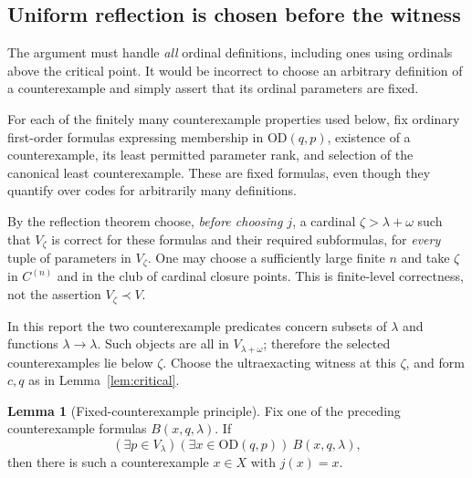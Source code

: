 \documentclass[11pt,letterpaper]{article}
\theoremstyle{definition}
\newtheorem{lemma}[definition]{Lemma}
\numberwithin{equation}{section}
\newcommand{\OD}{\mathrm{OD}}
\begin{document}
\subsection{Uniform reflection is chosen before the witness}

The argument must handle \emph{all} ordinal definitions, including
ones using ordinals above the critical point. It would be incorrect
to choose an arbitrary definition of a counterexample and simply
assert that its ordinal parameters are fixed.

For each of the finitely many counterexample properties used below,
fix ordinary first-order formulas expressing membership in
$\OD(q,p)$, existence of a counterexample, its least permitted
parameter rank, and selection of the canonical least counterexample.
These are fixed formulas, even though they quantify over codes for
arbitrarily many definitions.

By the reflection theorem choose, \emph{before choosing $j$}, a cardinal
$\zeta>\lambda+\omega$ such that $V_\zeta$ is correct for these formulas
and their required subformulas, for \emph{every} tuple of parameters
in $V_\zeta$. One may choose a sufficiently large finite $n$ and take
$\zeta$ in $C^{(n)}$ and in the club of cardinal closure points.
This is finite-level correctness, not the assertion
$V_\zeta\prec V$.

In this report the two counterexample predicates concern subsets of
$\lambda$ and functions $\lambda\to\lambda$. Such objects are all in
$V_{\lambda+\omega}$; therefore the selected counterexamples lie
below $\zeta$. Choose the ultraexacting witness at this $\zeta$, and
form $c,q$ as in Lemma~\ref{lem:critical}.

\begin{lemma}[Fixed-counterexample principle]\label{lem:minrank}
Fix one of the preceding counterexample formulas $B(x,q,\lambda)$.
If
\[
 (\exists p\in V_\lambda)(\exists x\in\OD(q,p))\ B(x,q,\lambda),
\]
then there is such a counterexample $x\in X$ with $j(x)=x$.
\end{lemma}
\end{document}
